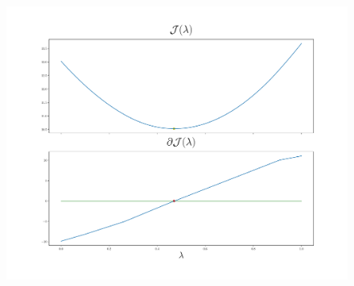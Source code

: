 \documentclass{beamer}
\newtheorem{proposition}[theorem]{Proposicion}
\newcommand{\mymax}[1]{\max\left(#1\right)}
\newcommand{\mymin}[1]{\min\left(#1\right)}
\newcommand{\npertask}{m}
\begin{document}
\begin{frame}
\end{frame}

\begin{frame}

      \begin{figure}[t!]
            \centering
            \includegraphics[width=.6\textwidth]{Chapter4/NeuroCom2021/ejemplo2_sqhinge.pdf}
            \label{fig:sq_error}
        \end{figure}      

\end{frame}
\end{document}
